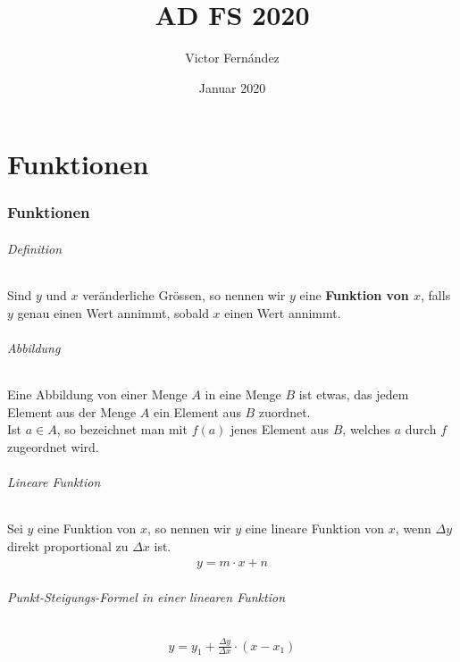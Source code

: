 \documentclass[10pt,a4paper]{article}
\title{AD FS 2020}
\author{Victor Fernández}
\date{Januar 2020}
\begin{document}
\maketitle
\tableofcontents
\thispagestyle{empty}
\pagebreak

\part{Funktionen}
\section{Funktionen}
\paragraph{Definition}Sind $y$ und $x$ veränderliche Grössen, so nennen wir $y$ eine \textbf{Funktion von $x$}, falls $y$ genau einen Wert annimmt, sobald $x$ einen Wert annimmt.
\paragraph{Abbildung}Eine Abbildung von einer Menge $A$ in eine Menge $B$ ist etwas, das jedem Element aus der Menge $A$ ein Element aus $B$ zuordnet.\\
Ist $a \in A$, so bezeichnet man mit $f(a)$ jenes Element aus $B$, welches $a$ durch $f$ zugeordnet wird.

\paragraph{Lineare Funktion}Sei $y$ eine Funktion von $x$, so nennen wir $y$ eine lineare Funktion von $x$, wenn $\Delta y$ direkt proportional zu $\Delta x$ ist.
\begin{align}
    y=m\cdot x + n
\end{align}
\paragraph{Punkt-Steigungs-Formel in einer linearen Funktion}
\begin{align}
    y = y_1+\frac{\Delta y}{\Delta x}\cdot(x-x_1)
\end{align}
\end{document}
